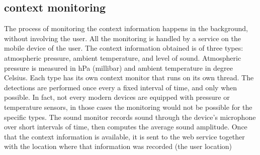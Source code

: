 \subsection{context monitoring}

The process of monitoring the context information happens in the background, without involving the user.
All the monitoring is handled by a service on the mobile device of the user.
The context information obtained is of three types: atmospheric pressure, ambient temperature, and level of sound. 
Atmospheric pressure is measured in hPa (millibar) and ambient temperature in degree Celsius.
Each type has its own context monitor that runs on its own thread.
The detections are performed once every a fixed interval of time, and only when possible. In fact, not every modern devices are equipped with pressure or temperature sensors, in those cases the monitoring would not be possible for the specific types.
The sound monitor records sound through the device's microphone over short intervals of time, then computes the average sound amplitude.
Once that the context information is available, it is sent to the web service together with the location where that information was recorded (the user location)
